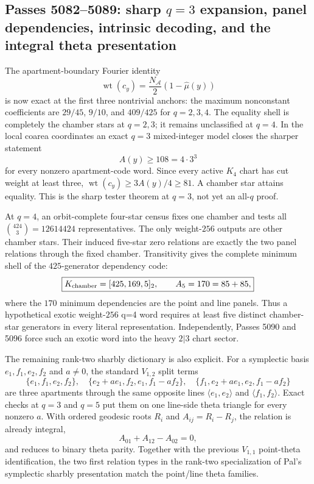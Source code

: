 \ifdefined\WPassFiveZeroEightTwoLoaded\else
\gdef\WPassFiveZeroEightTwoLoaded{1}
\subsection*{Passes 5082--5089: sharp $q=3$ expansion, panel dependencies, intrinsic decoding, and the integral theta presentation}
The apartment-boundary Fourier identity
\[
 \operatorname{wt}(c_y)=\frac{N_{\mathcal A}}2(1-\widehat\mu(y))
\]
is now exact at the first three nontrivial anchors: the maximum nonconstant coefficients are $29/45$, $9/10$, and $409/425$ for $q=2,3,4$.  The equality shell is completely the chamber stars at $q=2,3$; it remains unclassified at $q=4$.  In the local coarea coordinates an exact $q=3$ mixed-integer model closes the sharper statement
\[
 A(y)\ge108=4\cdot3^3
\]
for every nonzero apartment-code word.  Since every active $K_4$ chart has cut weight at least three, $\operatorname{wt}(c_y)\ge3A(y)/4\ge81$.  A chamber star attains equality.  This is the sharp tester theorem at $q=3$, not yet an all-$q$ proof.

At $q=4$, an orbit-complete four-star census fixes one chamber and tests all $\binom{424}{3}=12614424$ representatives.  The only weight-$256$ outputs are other chamber stars.  Their induced five-star zero relations are exactly the two panel relations through the fixed chamber.  Transitivity gives the complete minimum shell of the $425$-generator dependency code:
\[
 \boxed{K_{\rm chamber}=[425,169,5]_2,\qquad A_5=170=85+85,}
\]
where the $170$ minimum dependencies are the point and line panels.  Thus a hypothetical exotic weight-$256$ q=4 word requires at least five distinct chamber-star generators in every literal representation.  Independently, Passes 5090 and 5096 force such an exotic word into the heavy $2|3$ chart sector.

The remaining rank-two sharbly dictionary is also explicit.  For a symplectic basis $e_1,f_1,e_2,f_2$ and $a\ne0$, the standard $V_{1,2}$ split terms
\[
 \{e_1,f_1,e_2,f_2\},\quad
 \{e_2+ae_1,f_2,e_1,f_1-af_2\},\quad
 \{f_1,e_2+ae_1,e_2,f_1-af_2\}
\]
are three apartments through the same opposite lines $\langle e_1,e_2\rangle$ and $\langle f_1,f_2\rangle$.  Exact checks at $q=3$ and $q=5$ put them on one line-side theta triangle for every nonzero $a$.  With ordered geodesic roots $R_i$ and $A_{ij}=R_i-R_j$, the relation is already integral,
\[
 A_{01}+A_{12}-A_{02}=0,
\]
and reduces to binary theta parity.  Together with the previous $V_{1,1}$ point-theta identification, the two first relation types in the rank-two specialization of Pal's symplectic sharbly presentation match the point/line theta families.

